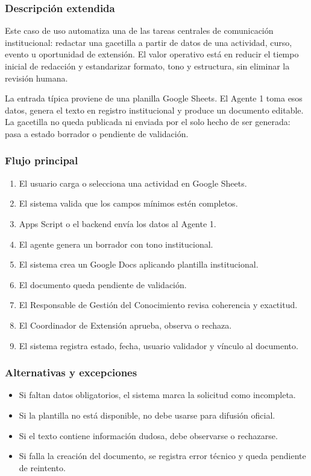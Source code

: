 \documentclass[11pt,a4paper]{article}
\begin{document}
\subsubsection{Descripción extendida}

Este caso de uso automatiza una de las tareas centrales de comunicación institucional: redactar una gacetilla a partir de datos de una actividad, curso, evento u oportunidad de extensión. El valor operativo está en reducir el tiempo inicial de redacción y estandarizar formato, tono y estructura, sin eliminar la revisión humana.

La entrada típica proviene de una planilla Google Sheets. El Agente 1 toma esos datos, genera el texto en registro institucional y produce un documento editable. La gacetilla no queda publicada ni enviada por el solo hecho de ser generada: pasa a estado borrador o pendiente de validación.

\subsubsection{Flujo principal}

\begin{enumerate}
  \item El usuario carga o selecciona una actividad en Google Sheets.
  \item El sistema valida que los campos mínimos estén completos.
  \item Apps Script o el backend envía los datos al Agente 1.
  \item El agente genera un borrador con tono institucional.
  \item El sistema crea un Google Docs aplicando plantilla institucional.
  \item El documento queda pendiente de validación.
  \item El Responsable de Gestión del Conocimiento revisa coherencia y exactitud.
  \item El Coordinador de Extensión aprueba, observa o rechaza.
  \item El sistema registra estado, fecha, usuario validador y vínculo al documento.
\end{enumerate}

\subsubsection{Alternativas y excepciones}

\begin{itemize}
  \item Si faltan datos obligatorios, el sistema marca la solicitud como incompleta.
  \item Si la plantilla no está disponible, no debe usarse para difusión oficial.
  \item Si el texto contiene información dudosa, debe observarse o rechazarse.
  \item Si falla la creación del documento, se registra error técnico y queda pendiente de reintento.
\end{itemize}
\end{document}
